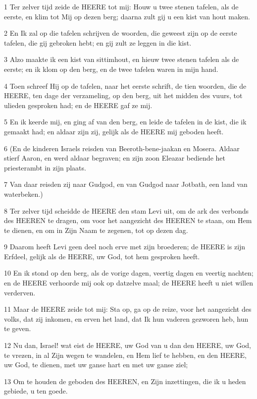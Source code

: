 \par 1 Ter zelver tijd zeide de HEERE tot mij: Houw u twee stenen tafelen, als de eerste, en klim tot Mij op dezen berg; daarna zult gij u een kist van hout maken.
\par 2 En Ik zal op die tafelen schrijven de woorden, die geweest zijn op de eerste tafelen, die gij gebroken hebt; en gij zult ze leggen in die kist.
\par 3 Alzo maakte ik een kist van sittimhout, en hieuw twee stenen tafelen als de eerste; en ik klom op den berg, en de twee tafelen waren in mijn hand.
\par 4 Toen schreef Hij op de tafelen, naar het eerste schrift, de tien woorden, die de HEERE, ten dage der verzameling, op den berg, uit het midden des vuurs, tot ulieden gesproken had; en de HEERE gaf ze mij.
\par 5 En ik keerde mij, en ging af van den berg, en leide de tafelen in de kist, die ik gemaakt had; en aldaar zijn zij, gelijk als de HEERE mij geboden heeft.
\par 6 (En de kinderen Israels reisden van Beeroth-bene-jaakan en Mosera. Aldaar stierf Aaron, en werd aldaar begraven; en zijn zoon Eleazar bediende het priesterambt in zijn plaats.
\par 7 Van daar reisden zij naar Gudgod, en van Gudgod naar Jotbath, een land van waterbeken.)
\par 8 Ter zelver tijd scheidde de HEERE den stam Levi uit, om de ark des verbonds des HEEREN te dragen, om voor het aangezicht des HEEREN te staan, om Hem te dienen, en om in Zijn Naam te zegenen, tot op dezen dag.
\par 9 Daarom heeft Levi geen deel noch erve met zijn broederen; de HEERE is zijn Erfdeel, gelijk als de HEERE, uw God, tot hem gesproken heeft.
\par 10 En ik stond op den berg, als de vorige dagen, veertig dagen en veertig nachten; en de HEERE verhoorde mij ook op datzelve maal; de HEERE heeft u niet willen verderven.
\par 11 Maar de HEERE zeide tot mij: Sta op, ga op de reize, voor het aangezicht des volks, dat zij inkomen, en erven het land, dat Ik hun vaderen gezworen heb, hun te geven.
\par 12 Nu dan, Israel! wat eist de HEERE, uw God van u dan den HEERE, uw God, te vrezen, in al Zijn wegen te wandelen, en Hem lief te hebben, en den HEERE, uw God, te dienen, met uw ganse hart en met uw ganse ziel;
\par 13 Om te houden de geboden des HEEREN, en Zijn inzettingen, die ik u heden gebiede, u ten goede.
